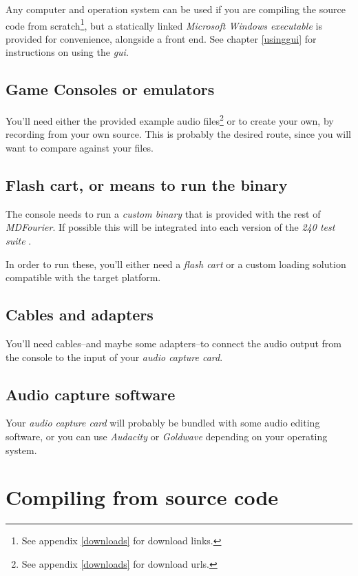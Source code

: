 \documentclass[10pt,a4paper]{report}
\newcommand{\ac}[1]{\textit{\acrshort{#1}}}
\begin{document}
\begin{appendices}
Any computer and operation system can be used if you are compiling the source code from scratch\footnote{See appendix \ref{downloads} for download links.}, but a statically linked \textit{Microsoft Windows executable} is provided for convenience, alongside a front end. See chapter \ref{usinggui} for instructions on using the \ac{gui}.

\section{Game Consoles or emulators}

You'll need either the provided example audio files\footnote{See appendix \ref{downloads} for download urls.} or to create your own, by recording from your own source. This is probably the desired route, since you will want to compare against your files.

\section{Flash cart, or means to run the binary}

The console needs to run a \textit{custom binary} that is provided with the rest of \textit{MDFourier}. If possible this will be integrated into each version of the \textit{240 test suite} \cite{240pSuite}.

In order to run these, you'll either need a \textit{flash cart} or a custom loading solution compatible with the target platform.

\section{Cables and adapters}

You'll need cables--and maybe some adapters--to connect the audio output from the console to the input of your \textit{audio capture card}.

\section{Audio capture software}

Your \textit{audio capture card} will probably be bundled with some audio editing software, or you can use \textit{Audacity} \cite{audacity} or \textit{Goldwave} \cite{goldwave} depending on your operating system.

\chapter{Compiling from source code}


\end{appendices}
\end{document}
